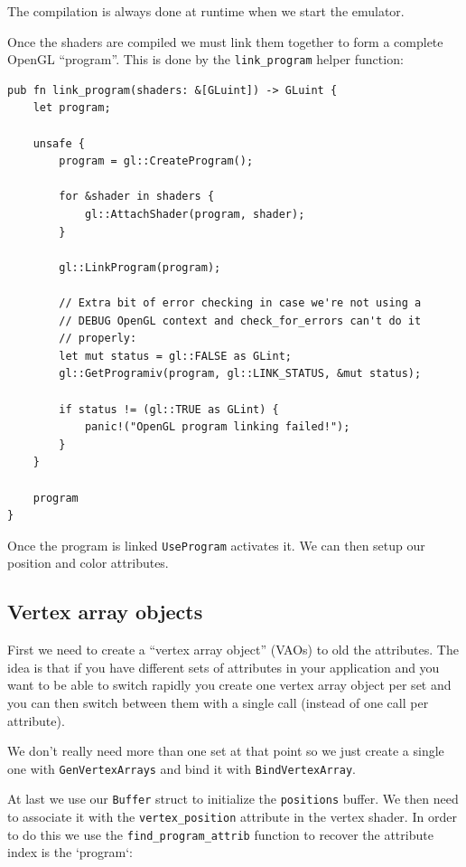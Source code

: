 \documentclass[a4paper]{article}
\newcommand{\code}[1] {\texttt{#1}}
\begin{document}
The compilation is always done at runtime when we start the emulator.

Once the shaders are compiled we must link them together to form a
complete OpenGL ``program''. This is done by the \code{link\_program}
helper function:

\begin{lstlisting}
pub fn link_program(shaders: &[GLuint]) -> GLuint {
    let program;

    unsafe {
        program = gl::CreateProgram();

        for &shader in shaders {
            gl::AttachShader(program, shader);
        }

        gl::LinkProgram(program);

        // Extra bit of error checking in case we're not using a
        // DEBUG OpenGL context and check_for_errors can't do it
        // properly:
        let mut status = gl::FALSE as GLint;
        gl::GetProgramiv(program, gl::LINK_STATUS, &mut status);

        if status != (gl::TRUE as GLint) {
            panic!("OpenGL program linking failed!");
        }
    }

    program
}
\end{lstlisting}

Once the program is linked \code{UseProgram} activates it. We can then
setup our position and color attributes.

\subsection{Vertex array objects}

First we need to create a ``vertex array object'' (VAOs) to old the
attributes. The idea is that if you have different sets of attributes
in your application and you want to be able to switch rapidly you
create one vertex array object per set and you can then switch between
them with a single call (instead of one call per attribute).

We don't really need more than one set at that point so we just create
a single one with \code{GenVertexArrays} and bind it with
\code{BindVertexArray}.

At last we use our \code{Buffer} struct to initialize the
\code{positions} buffer. We then need to associate it with the
\code{vertex\_position} attribute in the vertex shader. In order to do
this we use the \code{find\_program\_attrib} function to recover the
attribute index is the `program`:
\end{document}
